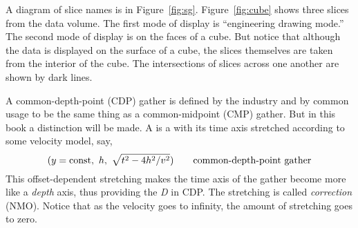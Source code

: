 \par
A diagram of slice names is in Figure~\ref{fig:sg}.
Figure~\ref{fig:cube} shows three slices from the data volume.
The first mode of display is ``engineering drawing mode.''
The second mode of display is on the faces of a cube.
But notice that although the data is displayed on the surface
of a cube, the slices themselves are taken from the interior of the cube.
The intersections of slices across one another are shown by dark lines.


\par
A common-depth-point (CDP) gather is defined
by the industry and by common usage
to be the same thing as a common-midpoint (CMP) gather.
But in this book
a distinction will be made.
A  is a  with its time
axis stretched according to some velocity model, say,
$$
(y=\hbox{const},\ h,\ \sqrt{t^2 - 4h^2 /v^2 }) \quad \quad
\hbox{common-depth-point gather}
$$
This offset-dependent stretching makes the time axis of the gather 
become more like a
{\em depth}
axis, thus providing the
{\em D} 
in CDP.
The stretching is called 
{\em 
{} correction
}
(NMO).
Notice that as the velocity goes to infinity, the amount of stretching
goes to zero.

